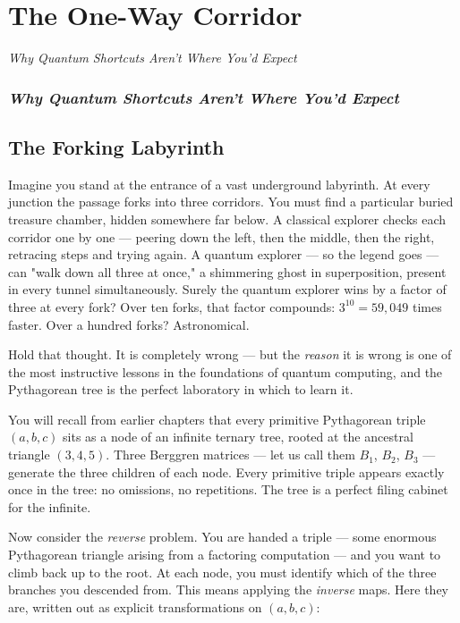 \chapter{The One-Way Corridor}

\begin{center}\textit{Why Quantum Shortcuts Aren't Where You'd Expect}\end{center}
\bigskip

\subsection*{\textit{Why Quantum Shortcuts Aren't Where You'd Expect}}

\bigskip

\section*{The Forking Labyrinth}

Imagine you stand at the entrance of a vast underground labyrinth. At every junction the passage forks into three corridors. You must find a particular buried treasure chamber, hidden somewhere far below. A classical explorer checks each corridor one by one --- peering down the left, then the middle, then the right, retracing steps and trying again. A quantum explorer --- so the legend goes --- can "walk down all three at once," a shimmering ghost in superposition, present in every tunnel simultaneously. Surely the quantum explorer wins by a factor of three at every fork? Over ten forks, that factor compounds: $3^{10} = 59{,}049$ times faster. Over a hundred forks? Astronomical.

Hold that thought. It is completely wrong --- but the \textit{reason} it is wrong is one of the most instructive lessons in the foundations of quantum computing, and the Pythagorean tree is the perfect laboratory in which to learn it.

You will recall from earlier chapters that every primitive Pythagorean triple $(a, b, c)$ sits as a node of an infinite ternary tree, rooted at the ancestral triangle $(3, 4, 5)$. Three Berggren matrices --- let us call them $B_1$, $B_2$, $B_3$ --- generate the three children of each node. Every primitive triple appears exactly once in the tree: no omissions, no repetitions. The tree is a perfect filing cabinet for the infinite.

Now consider the \textit{reverse} problem. You are handed a triple --- some enormous Pythagorean triangle arising from a factoring computation --- and you want to climb back up to the root. At each node, you must identify which of the three branches you descended from. This means applying the \textit{inverse} maps. Here they are, written out as explicit transformations on $(a, b, c)$:

